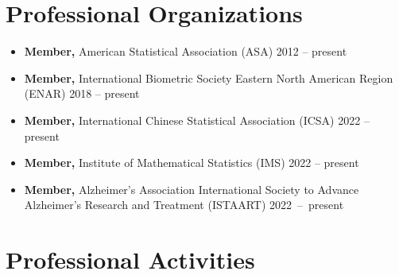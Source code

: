 \documentclass[12pt,letterpaper]{article}
\newenvironment{cventry}{\begin{minipage}[t]{\linewidth}}{\end{minipage}}
\begin{document}
		
	\section*{Professional Organizations}
	\begin{itemize}
		\item\begin{cventry} {\bf Member,} American Statistical Association (ASA) \hfill 2012 -- present
		\par\end{cventry}
		\item\begin{cventry} {\bf Member,} International Biometric Society Eastern North American Region (ENAR) \hfill 2018 -- present
		\par\end{cventry}
		\item\begin{cventry} {\bf Member,} International Chinese Statistical Association (ICSA) \hfill 2022 -- present
		\par\end{cventry}
		\item\begin{cventry} {\bf Member,} Institute of Mathematical Statistics (IMS) \hfill 2022 -- present
		\par\end{cventry}
		\item\begin{cventry} {\bf Member,} Alzheimer's Association International 
		Society to Advance Alzheimer's Research and Treatment 
		(ISTAART) \hfill \mbox{2022 -- present}
		\par\end{cventry}
	\end{itemize}

	\section*{Professional Activities}
	
\end{document}
